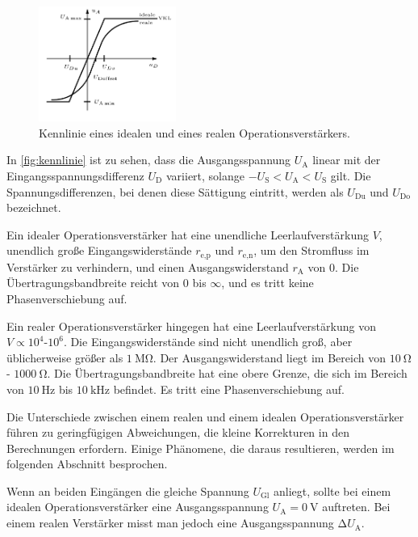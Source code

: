 \begin{figure}%
    \centering%
    
    \includegraphics[width=0.4\textwidth]{Bilder/kennlinie_buch.png}%
    \caption{Kennlinie eines idealen und eines realen Operationsverstärkers. \cite{BrabetzHaasSpieker+2015}}%
    \label{fig:kennlinie}%
\end{figure}%

In \autoref{fig:kennlinie} ist zu sehen, dass die Ausgangsspannung $U_\text{A}$ linear mit der Eingangsspannungsdifferenz $U_\text{D}$ variiert, solange $- U_\text{S} < U_\text{A} < U_\text{S}$ gilt. Die Spannungsdifferenzen, bei denen diese Sättigung eintritt, werden als $U_\text{Du}$ und $U_\text{Do}$ bezeichnet.

Ein idealer Operationsverstärker hat eine unendliche Leerlaufverstärkung $V$, unendlich große Eingangswiderstände $r_\text{e,p}$ und $r_\text{e,n}$, um den Stromfluss im Verstärker zu verhindern, und einen Ausgangswiderstand $r_\text{A}$ von $0$. Die Übertragungsbandbreite reicht von $0$ bis $\infty$, und es tritt keine Phasenverschiebung auf.

Ein realer Operationsverstärker hingegen hat eine Leerlaufverstärkung von $V \propto 10^4$-$10^6$. Die Eingangswiderstände sind nicht unendlich groß, aber üblicherweise größer als $\SI{1}{\mega\ohm}$. Der Ausgangswiderstand liegt im Bereich von $\SI{10}{\ohm}$ - $\SI{1000}{\ohm}$. Die Übertragungsbandbreite hat eine obere Grenze, die sich im Bereich von $\SI{10}{\hertz}$ bis $\SI{10}{\kilo\hertz}$ befindet. Es tritt eine Phasenverschiebung auf.

Die Unterschiede zwischen einem realen und einem idealen Operationsverstärker führen zu geringfügigen Abweichungen, die kleine Korrekturen in den Berechnungen erfordern. Einige Phänomene, die daraus resultieren, werden im folgenden Abschnitt besprochen.

\noindent 
Wenn an beiden Eingängen die gleiche Spannung $U_\text{Gl}$ anliegt, sollte bei einem idealen Operationsverstärker eine Ausgangsspannung $U_\text{A} = \SI{0}{\volt}$ auftreten. Bei einem realen Verstärker misst man jedoch eine Ausgangsspannung $\increment U_\text{A}$.

